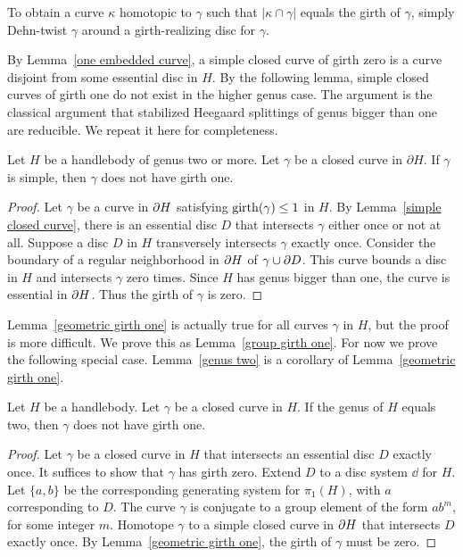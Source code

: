 To obtain a curve $\kappa$ homotopic to $\gamma$ such that $|\kappa \cap \gamma|$ equals the girth of $\gamma$, simply Dehn-twist $\gamma$ around a girth-realizing disc for $\gamma$. 

By Lemma~\ref{one embedded curve}, a simple closed curve of girth zero is a curve disjoint from some essential disc in $H$.  By the following lemma, simple closed curves of girth one do not exist in the higher genus case.  The argument is the classical argument that stabilized Heegaard splittings of genus bigger than one are reducible.  We repeat it here for completeness.
  
\begin{lemma}
\label{geometric girth one}
Let $H$ be a handlebody of genus two or more.  Let $\gamma$ be a closed curve in $\partial H$.  If $\gamma$ is simple, then $\gamma$ does not have girth one.
\end{lemma}

\begin{proof}
Let $\gamma$ be a curve in $\partial H$ satisfying $\operatorname{girth}(\gamma)\leq 1$ in $H$.
By Lemma~\ref{simple closed curve}, there is an essential disc $D$ that
intersects $\gamma$ either once or not at all.  Suppose a disc $D$ in $H$ transversely intersects $\gamma$ exactly once. Consider the boundary of a regular neighborhood in $\partial H$ of $\gamma\cup\partial D$.
This curve bounds a disc in $H$ and intersects $\gamma$ zero times.
Since $H$ has genus bigger than one, the curve is essential in $\partial H$.
Thus the girth of $\gamma$ is zero.
\end{proof}

Lemma~\ref{geometric girth one} is actually true for all curves $\gamma$ in $H$, but the proof is more difficult.  We prove this as Lemma~\ref{group girth one}.  For now we prove the following special case.  Lemma~\ref{genus two} is a corollary of Lemma~\ref{geometric girth one}.

\begin{lemma}
\label{genus two}
Let $H$ be a handlebody.  Let $\gamma$ be a closed curve in $H$.  If the genus of $H$ equals two, then $\gamma$ does not have girth one.
\end{lemma}

\begin{proof}
Let $\gamma$ be a closed curve in $H$ that intersects an essential disc $D$ exactly once.  It suffices to show that $\gamma$ has girth zero.  Extend $D$ to a disc system $\dd$ for $H$.  Let $\{a, b\}$ be the corresponding generating system for $\pi_{1}(H)$, with $a$ corresponding to $D$.  The curve $\gamma$ is conjugate to a group element of the form $a b^{m}$, for some integer $m$.  Homotope $\gamma$ to a simple closed curve in $\partial H$ that intersects $D$ exactly once.  By Lemma~\ref{geometric girth one}, the girth of $\gamma$ must be zero.
\end{proof}

